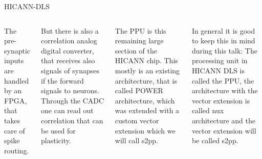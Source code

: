 \documentclass[10pt,aspectratio=169]{beamer}
\begin{document}
\begin{frame}{HICANN-DLS}
\begin{columns}[c]
{        The pre-synaptic inputs are handled by an FPGA, that takes care of spike routing.
        
        But there is also a correlation analog digital converter, that receives also signals of synapses if the forward signals to neurons.
        Through the CADC one can read out correlation that can be used for plasticity.

        The PPU is this remaining large section of the HICANN chip.
		This mostly is an existing architecture, that is called POWER architecture, which was extended with a custom vector extension which we will call s2pp.

		In general it is good to keep this in mind during this talk:
		The processing unit in HICANN DLS is called the PPU, the architecture with the vector extension is called nux architecture and the vector extension will be called s2pp.
}
    \end{columns}

\end{frame}
\end{document}
